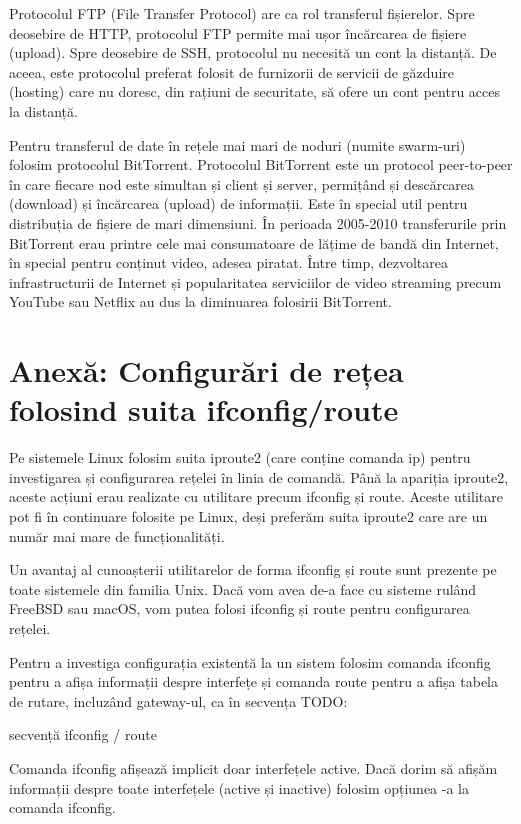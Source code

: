 Protocolul FTP (File Transfer Protocol) are ca rol transferul fișierelor. Spre deosebire de HTTP, protocolul FTP permite mai ușor încărcarea de fișiere (upload). Spre deosebire de SSH, protocolul nu necesită un cont la distanță. De aceea, este protocolul preferat folosit de furnizorii de servicii de găzduire (hosting) care nu doresc, din rațiuni de securitate, să ofere un cont pentru acces la distanță.

Pentru transferul de date în rețele mai mari de noduri (numite swarm-uri) folosim protocolul BitTorrent. Protocolul BitTorrent este un protocol peer-to-peer în care fiecare nod este simultan și client și server, permițând și descărcarea (download) și încărcarea (upload) de informații. Este în special util pentru distribuția de fișiere de mari dimensiuni. În perioada 2005-2010 transferurile prin BitTorrent erau printre cele mai consumatoare de lățime de bandă din Internet, în special pentru conținut video, adesea piratat. Între timp, dezvoltarea infrastructurii de Internet și popularitatea serviciilor de video streaming precum YouTube sau Netflix au dus la diminuarea folosirii BitTorrent.


\section{Anexă: Configurări de rețea folosind suita ifconfig/route}
\label{sec:net:config-ifconfig}

Pe sistemele Linux folosim suita iproute2 (care conține comanda ip) pentru investigarea și configurarea rețelei în linia de comandă. Până la apariția iproute2, aceste acțiuni erau realizate cu utilitare precum ifconfig și route. Aceste utilitare pot fi în continuare folosite pe Linux, deși preferăm suita iproute2 care are un număr mai mare de funcționalități.

Un avantaj al cunoașterii utilitarelor de forma ifconfig și route sunt prezente pe toate sistemele din familia Unix. Dacă vom avea de-a face cu sisteme rulând FreeBSD sau macOS, vom putea folosi ifconfig și route pentru configurarea rețelei.

Pentru a investiga configurația existentă la un sistem folosim comanda ifconfig pentru a afișa informații despre interfețe și comanda route pentru a afișa tabela de rutare, incluzând gateway-ul, ca în secvența TODO:

secvență ifconfig / route

Comanda ifconfig afișează implicit doar interfețele active. Dacă dorim să afișăm informații despre toate interfețele (active și inactive) folosim opțiunea -a la comanda ifconfig.

